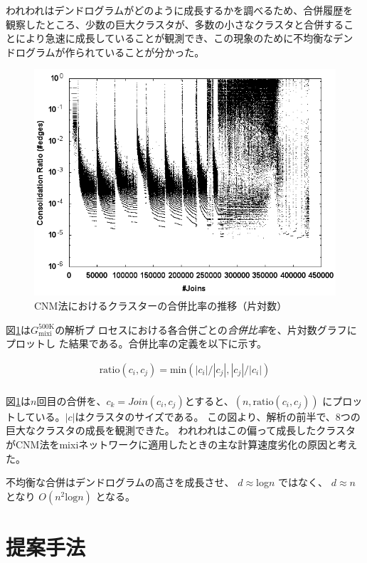 \documentclass [a4j,11pt] {jsarticle}
\begin{document}
われわれはデンドログラムがどのように成長するかを調べるため、合併履歴を
観察したところ、少数の巨大クラスタが、多数の小さなクラスタと合併するこ
とにより急速に成長していることが観測でき、この現象のために不均衡なデン
ドログラムが作られていることが分かった。

\begin {figure}[htbp]
  \centerline {\includegraphics [width=0.80\linewidth]{fig3-cnm-ratio-join.png}}
  \caption {CNM法におけるクラスターの合併比率の推移（片対数）}
  \label {fig: clauset ratio}
\end{figure}

図\ref {fig: clauset ratio}は$G_{\text {mixi}}^{\text {500K}}$の解析プ
ロセスにおける各合併ごとの\emph {合併比率}を、片対数グラフにプロットし
た結果である。合併比率の定義を以下に示す。

\begin {align*}
  \text{ratio}(c_i,c_j) = \text{min}(|c_i|/|c_j|,|c_j|/|c_i|) \\
\end {align*}

図\ref{fig: clauset ratio}は$n$回目の合併を、$c_k=Join(c_i,c_j)$とすると、$(n,\text{ratio}(c_i,c_j))$
にプロットしている。$|c|$はクラスタのサイズである。
この図より、解析の前半で、8つの巨大なクラスタの成長を観測できた。
われわれはこの偏って成長したクラスタがCNM法をmixiネットワークに適用したときの主な計算速度劣化の原因と考えた。


不均衡な合併はデンドログラムの高さを成長させ、
$d\approx$log$n$
ではなく、
$d\approx n$
となり
$O(n^2\text{log}n)$
となる。


\section {提案手法}
\label {sect: algorithm}
\end{document}
